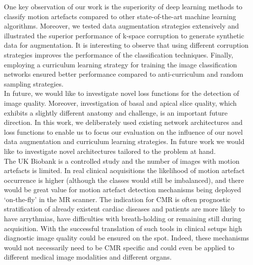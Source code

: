 \documentclass[preprint,12pt,authoryear]{elsarticle}
\begin{document}
One key observation of our work is the superiority of deep learning methods to classify motion artefacts compared to other state-of-the-art machine learning algorithms. Moreover, we tested data augmentation strategies extensively and illustrated the superior performance of k-space corruption to generate synthetic data for augmentation. It is interesting to observe that using different corruption strategies improves the performance of the classification techniques. Finally, employing a curriculum learning strategy for training the image classification networks ensured better performance compared to anti-curriculum and random sampling strategies.\\


In future, we would like to investigate novel loss functions for the detection of image quality. Moreover, investigation of basal and apical slice quality, which exhibits a slightly different anatomy and challenge, is an important future direction. In this work, we deliberately used existing network architectures and loss functions to enable us to focus our evaluation on the influence of our novel data augmentation and curriculum learning strategies. In future work we would like to investigate novel architectures tailored to the problem at hand. \\


The UK Biobank is a controlled study and the number of images with motion artefacts is limited. In real clinical acquisitions the likelihood of motion artefact occurrence is higher (although the classes would still be imbalanced), and there would be great value for motion artefact detection mechanisms being deployed `on-the-fly' in the MR scanner. The indication for CMR is often prognostic stratification of already existent cardiac diseases and  patients are more likely to have arrythmias, have difficulties with breath-holding  or remaining still during acquisition. With the successful translation of such tools in clinical setups high diagnostic image quality could be ensured on the spot. Indeed, these mechanisms would not necessarily need to be CMR specific and could even be applied to different medical image modalities and different organs.\\
\end{document}
